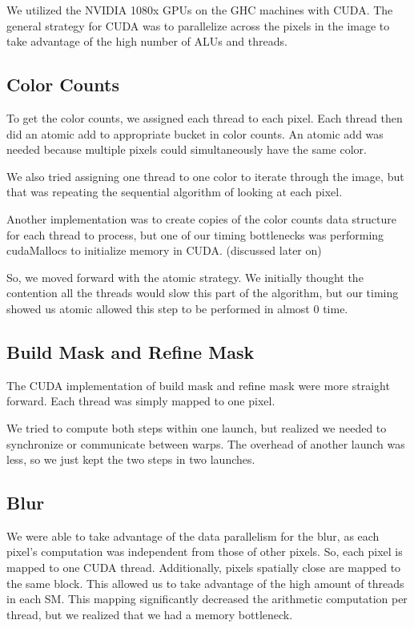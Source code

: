 \documentclass[12pt]{article}
\begin{document}
We utilized the NVIDIA 1080x GPUs on the GHC machines with CUDA. The general
strategy for CUDA was to parallelize across the pixels in the image to take
advantage of the high number of ALUs and threads.

\subsection{Color Counts}

To get the color counts, we assigned each thread to each pixel. Each thread
then did an atomic add to appropriate bucket in color counts. An atomic add was
needed because multiple pixels could simultaneously have the same color.

We also tried assigning one thread to one color to iterate through the image,
but that was repeating the sequential algorithm of looking at each pixel.

Another implementation was to create copies of the color counts data structure
for each thread to process, but one of our timing bottlenecks was performing
cudaMallocs to initialize memory in CUDA. (discussed later on)

So, we moved forward with the atomic strategy. We initially thought the
contention all the threads would slow this part of the algorithm, but our
timing showed us atomic allowed this step to be performed in almost 0 time.

\subsection{Build Mask and Refine Mask}

The CUDA implementation of build mask and refine mask were more straight
forward. Each thread was simply mapped to one pixel.

We tried to compute both steps within one launch, but realized we needed to
synchronize or communicate between warps. The overhead of another launch was
less, so we just kept the two steps in two launches.

\subsection{Blur}

We were able to take advantage of the data parallelism for the blur, as each
pixel's computation was independent from those of other pixels. So, each pixel
is mapped to one CUDA thread. Additionally, pixels spatially close are mapped
to the same block. This allowed us to take advantage of the high amount of
threads in each SM. This mapping significantly decreased the arithmetic
computation per thread, but we realized that we had a memory bottleneck.
\end{document}
